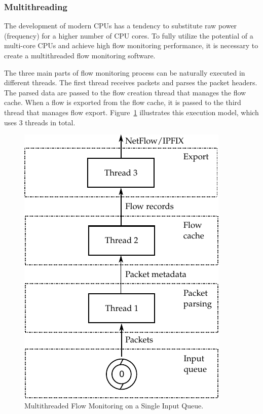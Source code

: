 \subsubsection{Multithreading}

The development of modern CPUs has a tendency to substitute raw power (frequency) for a higher number of CPU cores. To fully utilize the potential of a multi-core CPUs and achieve high flow monitoring performance, it is necessary to create a multithreaded flow monitoring software.

The three main parts of flow monitoring process can be naturally executed in different threads. The first thread receives packets and parses the packet headers. The parsed data are passed to the flow creation thread that manages the flow cache. When a flow is exported from the flow cache, it is passed to the third thread that manages flow export. Figure~\ref{fig:exporter-thread-noRSS} illustrates this execution model, which uses $3$ threads in total.

\begin{figure}[t!]
  \begin{center}
    \includegraphics{figures/c05/exporter-thread-noRSS}
  \end{center}
  \caption{Multithreaded Flow Monitoring on a Single Input Queue.}
  \label{fig:exporter-thread-noRSS}
\end{figure}


